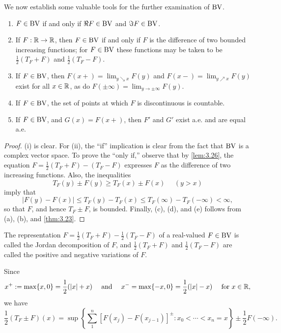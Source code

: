 \documentclass[12pt]{article} %
\begin{document}
We now establish some valuable tools for the further examination of $\operatorname{BV}$.

\begin{theorem}\label{thm:3.27}
    \begin{enumerate}
        \item $F \in \operatorname{BV}$ if and only if $\Re F \in \operatorname{BV}$ and $\Im F \in \operatorname{BV}$.
        \item If $F : \mathbb{R} \to \mathbb{R}$, then $F \in \operatorname{BV}$ if and only if $F$ is the difference of two bounded increasing functions; for $F \in \operatorname{BV}$ these functions may be taken to be $\frac{1}{2}(T_F + F)$ and $\frac{1}{2}(T_F - F)$.
        \item If $F \in \operatorname{BV}$, then $F(x+) = \lim_{y \searrow x} F(y)$ and $F(x-) = \lim_{y \nearrow x}F(y)$ exist for all $x \in \mathbb{R}$, as do $F(\pm \infty) = \lim_{y \to \pm \infty} F(y)$.
        \item If $F \in \operatorname{BV}$, the set of points at which $F$ is discontinuous is countable.
        \item If $F \in \operatorname{BV}$, and $G(x) = F(x+)$, then $F'$ and $G'$ exist a.e. and are equal a.e.
    \end{enumerate}
\end{theorem}

\begin{proof}
    (i) is clear. For (ii), the ``if'' implication is clear from the fact that $\operatorname{BV}$ is a complex vector space. To prove the ``only if,'' observe that by \cref{lem:3.26}, the equation $F = \frac{1}{2}(T_F + F) - (T_F - F)$ expresses $F$ as the difference of two increasing functions. Also, the inequalities \[T_F(y) \pm F(y) \geq T_F(x) \pm F(x) \ \ \ \ \ \ (y > x)\] imply that \[|F(y) - F(x)| \leq T_F(y) - T_F(x) \leq T_F(\infty) - T_F(-\infty) < \infty,\] so that $F$, and hence $T_F \pm F$, is bounded. Finally, (c), (d), and (e) follows from (a), (b), and \cref{thm:3.23}.
\end{proof}

\begin{definition}
    The representation $F = \frac{1}{2}(T_F + F) - \frac{1}{2}(T_F - F)$ of a real-valued $F \in \operatorname{BV}$ is called the Jordan decomposition of $F$, and $\frac{1}{2}(T_F + F)$ and $\frac{1}{2}(T_F - F)$ are called the positive and negative variations of $F$.
\end{definition}

\noindent Since \[x^+ := \max\{x, 0\} = \frac{1}{2}(|x| + x) \ \ \ \ \text{and} \ \ \ \ x^- = \max\{-x, 0\} = \frac{1}{2}(|x| - x) \ \ \ \ \text{for $x \in \mathbb{R}$},\] we have \[\frac{1}{2}(T_F \pm F)(x) = \sup \left\{\sum_1^n [F(x_j) - F(x_{j-1})]^{\pm} : x_0 < \cdots < x_n = x\right\} \pm \frac{1}{2}F(-\infty).\]
\end{document}
